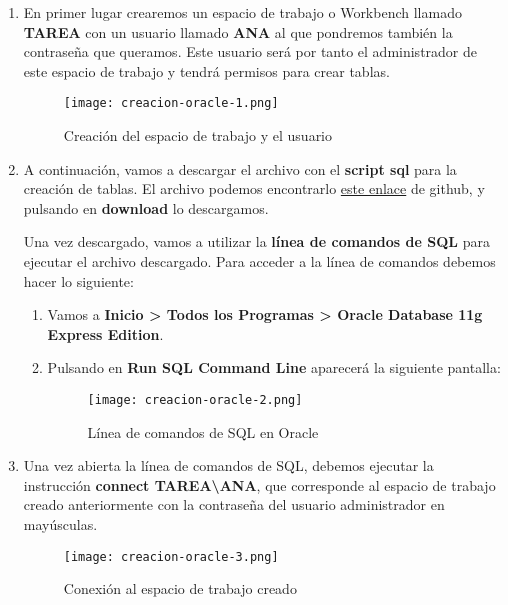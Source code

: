 \begin{enumerate}
    \item En primer lugar crearemos un espacio de trabajo o Workbench llamado \textbf{TAREA} con un usuario llamado \textbf{ANA} al que pondremos también la contraseña que queramos. Este usuario será por tanto el administrador de este espacio de trabajo y tendrá permisos para crear tablas.

    \begin{figure}[H]
        \centering
        \texttt{[image: creacion-oracle-1.png]}
        \caption{Creación del espacio de trabajo y el usuario}
    \end{figure}

    \item A continuación, vamos a descargar el archivo con el \textbf{script sql} para la creación de tablas. El archivo podemos encontrarlo \href{https://github.com/fcosueza/DAW/blob/main/BD/Apuntes/archivos/tema4-script-oracle.zip}{este enlace}  de github, y pulsando en \textbf{download} lo descargamos.

    Una vez descargado, vamos a utilizar la \textbf{línea de comandos de SQL} para ejecutar el archivo descargado. Para acceder a la línea de comandos debemos hacer lo siguiente:

    \begin{enumerate}
        \item Vamos a \textbf{Inicio > Todos los Programas > Oracle Database 11g Express Edition}.
        \item Pulsando en \textbf{Run SQL Command Line} aparecerá la siguiente pantalla:

        \begin{figure}[H]
            \centering
            \texttt{[image: creacion-oracle-2.png]}
            \caption{Línea de comandos de SQL en Oracle}
        \end{figure}
    \end{enumerate}

    \item Una vez abierta la línea de comandos de SQL, debemos ejecutar la instrucción \textbf{connect TAREA\textbackslash ANA}, que corresponde al espacio de trabajo creado anteriormente con la contraseña del usuario administrador en mayúsculas.

    \begin{figure}[H]
        \centering
        \texttt{[image: creacion-oracle-3.png]}
        \caption{Conexión al espacio de trabajo creado}
    \end{figure}


\end{enumerate}
